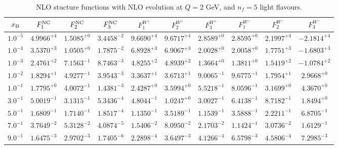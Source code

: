 \begin{table}[h]
\begin{adjustbox}{width=\textwidth}
\begin{tabular}{|c||c|c|c|c|c|c|c|c|c|}
\hline
$x_{\rm B}$ & $F_1^{\rm NC}$ & $F_2^{\rm NC}$ & $F_3^{\rm NC}$ & $F_1^{W^+}$ & $F_2^{W^+}$ & $F_3^{W^+}$ & $F_1^{W^-}$ & $F_2^{W^-}$ & $F_3^{W^-}$ \\
\hline
$ 1.0^{-5}$ & $ 4.9966^{+4}$ & $ 1.5085^{+0}$ & $ 3.4458^{-2}$ & $ 9.6690^{+4}$ & $ 9.6717^{+4}$ & $ 2.8589^{+0}$ & $ 2.8595^{+0}$ & $ 2.1997^{+4}$ & $-2.1814^{+4}$ \\
$ 1.0^{-4}$ & $ 3.5370^{+3}$ & $ 1.0505^{+0}$ & $ 1.7875^{-2}$ & $ 6.8928^{+3}$ & $ 6.9067^{+3}$ & $ 2.0028^{+0}$ & $ 2.0058^{+0}$ & $ 1.7751^{+3}$ & $-1.6803^{+3}$ \\
$ 1.0^{-3}$ & $ 2.4761^{+2}$ & $ 7.1563^{-1}$ & $ 8.7463^{-3}$ & $ 4.8255^{+2}$ & $ 4.8939^{+2}$ & $ 1.3664^{+0}$ & $ 1.3811^{+0}$ & $ 1.5419^{+2}$ & $-1.0784^{+2}$ \\
$ 1.0^{-2}$ & $ 1.8294^{+1}$ & $ 4.9277^{-1}$ & $ 3.9543^{-3}$ & $ 3.3637^{+1}$ & $ 3.6713^{+1}$ & $ 9.0065^{-1}$ & $ 9.6775^{-1}$ & $ 1.7954^{+1}$ & $ 2.9668^{+0}$ \\
$ 1.0^{-1}$ & $ 1.7795^{+0}$ & $ 4.0072^{-1}$ & $ 1.4381^{-3}$ & $ 2.4287^{+0}$ & $ 3.5994^{+0}$ & $ 5.5218^{-1}$ & $ 8.0596^{-1}$ & $ 3.1699^{+0}$ & $ 4.3670^{+0}$ \\
$ 3.0^{-1}$ & $ 5.0019^{-1}$ & $ 3.1315^{-1}$ & $ 5.3436^{-4}$ & $ 4.8044^{-1}$ & $ 1.0247^{+0}$ & $ 3.0027^{-1}$ & $ 6.4138^{-1}$ & $ 8.7182^{-1}$ & $ 1.8494^{+0}$ \\
$ 5.0^{-1}$ & $ 1.6809^{-1}$ & $ 1.7140^{-1}$ & $ 1.8517^{-4}$ & $ 1.1350^{-1}$ & $ 3.5189^{-1}$ & $ 1.1539^{-1}$ & $ 3.5888^{-1}$ & $ 2.2211^{-1}$ & $ 6.8705^{-1}$ \\
$ 7.0^{-1}$ & $ 3.7649^{-2}$ & $ 5.3128^{-2}$ & $ 4.0874^{-5}$ & $ 1.5406^{-2}$ & $ 8.0950^{-2}$ & $ 2.1703^{-2}$ & $ 1.1424^{-1}$ & $ 3.0736^{-2}$ & $ 1.6129^{-1}$ \\
$ 9.0^{-1}$ & $ 1.6475^{-3}$ & $ 2.9702^{-3}$ & $ 1.7405^{-6}$ & $ 2.2898^{-4}$ & $ 3.6497^{-3}$ & $ 4.1266^{-4}$ & $ 6.5798^{-3}$ & $ 4.5806^{-4}$ & $ 7.2985^{-3}$ \\
\hline
\end{tabular}
\end{adjustbox}\caption{NLO stucture functions with NLO evolution at $Q = 2$ GeV, and $n_f=5$ light flavours.}
\label{tab:N1LO-Q2}
\end{table}


